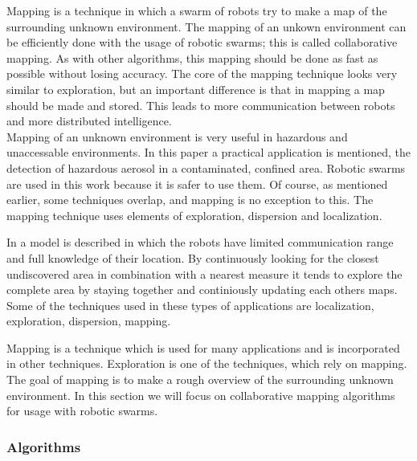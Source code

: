 
Mapping is a technique in which a swarm of robots try to make a map of the surrounding unknown environment. 
The mapping of an unkown environment can be efficiently done with the usage of robotic swarms; this is called collaborative mapping. 
As with other algorithms, this mapping should be done as fast as possible without losing accuracy. 
The core of the mapping technique looks very similar to exploration, but an important difference is that in mapping a map should be made and stored. 
This leads to more communication between robots and more distributed intelligence. \\

Mapping of an unknown environment is very useful in hazardous and unaccessable environments. \cite{hardin2004modified}
In this paper a practical application is mentioned, the detection of hazardous aerosol in a contaminated, confined area. 
Robotic swarms are used in this work because it is safer to use them. 
Of course, as mentioned earlier, some techniques overlap, and mapping is no exception to this. 
The mapping technique uses elements of exploration, dispersion and localization.  

In \cite{sheng2006distributed} a model is described in which the robots have limited communication range and full knowledge of their location. By continuously looking for the closest undiscovered area in combination with a nearest measure it tends to explore the complete area by staying together and continiously updating each others maps.
Some of the techniques used in these types of applications are localization, exploration, dispersion, mapping. \cite{sheng2006distributed,rothermich2005distributed} 

Mapping is a technique which is used for many applications and is incorporated in other techniques. Exploration is one of the techniques, which rely on mapping. The goal of mapping is to make a rough overview of the surrounding unknown environment. In this section we will focus on collaborative mapping algorithms for usage with robotic swarms.

\subsubsection{Algorithms}

